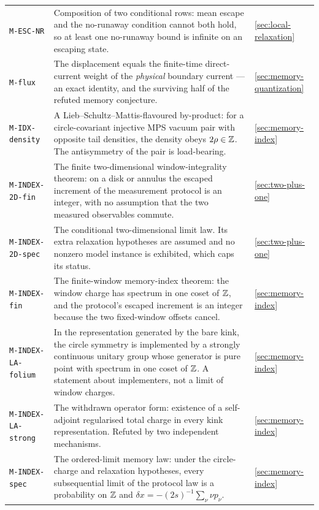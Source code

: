 {\begin{longtable}{@{}p{}p{}p{}@{}}
\texttt{M-ESC-NR} & Composition of two conditional rows: mean escape and the
no-runaway condition cannot both hold, so at least one no-runaway bound is
infinite on an escaping state. & \cref{sec:local-relaxation}\\

\texttt{M-flux} & The displacement equals the finite-time direct-current
weight of the \emph{physical} boundary current --- an exact identity, and the
surviving half of the refuted memory conjecture. & \cref{sec:memory-quantization}\\

\texttt{M-IDX-density} & A Lieb--Schultz--Mattis-flavoured by-product: for a
circle-covariant injective MPS vacuum pair with opposite tail densities, the
density obeys $2\rho\in\mathbb{Z}$. The antisymmetry of the pair is load-bearing. & \cref{sec:memory-index}\\

\texttt{M-INDEX-2D-fin} & The finite two-dimensional window-integrality
theorem: on a disk or annulus the escaped increment of the measurement
protocol is an integer, with no assumption that the two measured observables
commute. & \cref{sec:two-plus-one}\\

\texttt{M-INDEX-2D-spec} & The conditional two-dimensional limit law. Its
extra relaxation hypotheses are assumed and no nonzero model instance is
exhibited, which caps its status. & \cref{sec:two-plus-one}\\

\texttt{M-INDEX-fin} & The finite-window memory-index theorem: the window
charge has spectrum in one coset of $\mathbb{Z}$, and the protocol's escaped
increment is an integer because the two fixed-window offsets cancel. & \cref{sec:memory-index}\\

\texttt{M-INDEX-LA-folium} & In the representation generated by the bare kink,
the circle symmetry is implemented by a strongly continuous unitary group
whose generator is pure point with spectrum in one coset of $\mathbb{Z}$. A statement
about implementers, not a limit of window charges. & \cref{sec:memory-index}\\

\texttt{M-INDEX-LA-strong} & The withdrawn operator form: existence of a
self-adjoint regularised total charge in every kink representation. Refuted by
two independent mechanisms. & \cref{sec:memory-index}\\

\texttt{M-INDEX-spec} & The ordered-limit memory law: under the circle-charge
and relaxation hypotheses, every subsequential limit of the protocol law is a
probability on $\mathbb{Z}$ and $\delta x=-(2s)^{-1}\sum_\nu\nu p_\nu$. & \cref{sec:memory-index}\\


\end{longtable}}
